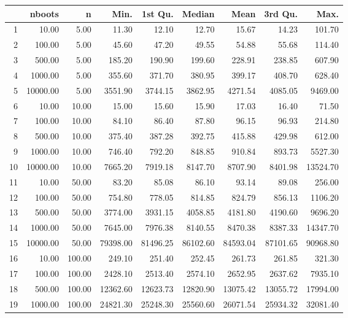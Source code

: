 \begin{table}[ht]
\centering
\begin{tabular}{rrrrrrrrr}
  \hline
 & nboots & n & Min. & 1st Qu. & Median & Mean & 3rd Qu. & Max. \\ 
  \hline
1 & 10.00 & 5.00 & 11.30 & 12.10 & 12.70 & 15.67 & 14.23 & 101.70 \\ 
  2 & 100.00 & 5.00 & 45.60 & 47.20 & 49.55 & 54.88 & 55.68 & 114.40 \\ 
  3 & 500.00 & 5.00 & 185.20 & 190.90 & 199.60 & 228.91 & 238.85 & 607.90 \\ 
  4 & 1000.00 & 5.00 & 355.60 & 371.70 & 380.95 & 399.17 & 408.70 & 628.40 \\ 
  5 & 10000.00 & 5.00 & 3551.90 & 3744.15 & 3862.95 & 4271.54 & 4085.05 & 9469.00 \\ 
  6 & 10.00 & 10.00 & 15.00 & 15.60 & 15.90 & 17.03 & 16.40 & 71.50 \\ 
  7 & 100.00 & 10.00 & 84.10 & 86.40 & 87.80 & 96.15 & 96.93 & 214.80 \\ 
  8 & 500.00 & 10.00 & 375.40 & 387.28 & 392.75 & 415.88 & 429.98 & 612.00 \\ 
  9 & 1000.00 & 10.00 & 746.40 & 792.20 & 848.85 & 910.84 & 893.73 & 5527.30 \\ 
  10 & 10000.00 & 10.00 & 7665.20 & 7919.18 & 8147.70 & 8707.90 & 8401.98 & 13524.70 \\ 
  11 & 10.00 & 50.00 & 83.20 & 85.08 & 86.10 & 93.14 & 89.08 & 256.00 \\ 
  12 & 100.00 & 50.00 & 754.80 & 778.05 & 814.85 & 824.79 & 856.13 & 1106.20 \\ 
  13 & 500.00 & 50.00 & 3774.00 & 3931.15 & 4058.85 & 4181.80 & 4190.60 & 9696.20 \\ 
  14 & 1000.00 & 50.00 & 7645.00 & 7976.38 & 8140.55 & 8470.38 & 8387.33 & 14347.70 \\ 
  15 & 10000.00 & 50.00 & 79398.00 & 81496.25 & 86102.60 & 84593.04 & 87101.65 & 90968.80 \\ 
  16 & 10.00 & 100.00 & 249.10 & 251.40 & 252.45 & 261.73 & 261.85 & 321.30 \\ 
  17 & 100.00 & 100.00 & 2428.10 & 2513.40 & 2574.10 & 2652.95 & 2637.62 & 7935.10 \\ 
  18 & 500.00 & 100.00 & 12362.60 & 12623.73 & 12820.90 & 13075.42 & 13055.72 & 17994.00 \\ 
  19 & 1000.00 & 100.00 & 24821.30 & 25248.30 & 25560.60 & 26071.54 & 25934.32 & 32081.40 \\ 

\end{tabular}
\end{table}
